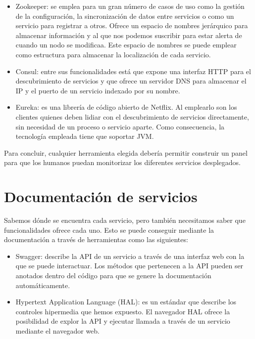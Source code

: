 \documentclass[11pt,a4paper]{article}
\begin{document}
\begin{itemize}

\item Zookeeper: se emplea para un gran número de casos de uso como la gestión de la configuración, la sincronización de datos entre servicios o como un servicio para registrar a otros. Ofrece un espacio de nombres jerárquico para almacenar información y al que nos podemos suscribir para estar alerta de cuando un nodo se modificaa. Este espacio de nombres se puede emplear como estructura para almacenar la localización de cada servicio.

\item Consul: entre sus funcionalidades está que expone una interfaz HTTP para el descubrimiento de servicios y que ofrece un servidor DNS para almacenar el IP y el puerto de un servicio indexado por su nombre.

\item Eureka: es una librería de código abierto de Netflix. Al emplearlo son los clientes quienes deben lidiar con el descubrimiento de servicios directamente, sin necesidad de un proceso o servicio aparte. Como consecuencia, la tecnología empleada tiene que soportar JVM.

\end{itemize}

Para concluir, cualquier herramienta elegida debería permitir construir un panel para que los humanos puedan monitorizar los diferentes servicios desplegados.

\section{Documentación de servicios}

Sabemos dónde se encuentra cada servicio, pero también necesitamos saber que funcionalidades ofrece cada uno. Esto se puede conseguir mediante la documentación a través de herramientas como las siguientes:

\begin{itemize}

\item Swagger: describe la API de un servicio a través de una interfaz web con la que se puede interactuar. Los métodos que pertenecen a la API pueden ser anotados dentro del código para que se genere la documentación automáticamente.

\item Hypertext Application Language (HAL): es un estándar que describe los controles hipermedia que hemos expuesto. El navegador HAL ofrece la posibilidad de explor la API y ejecutar llamada a través de un servicio mediante el navegador web.

\end{itemize}
\end{document}
